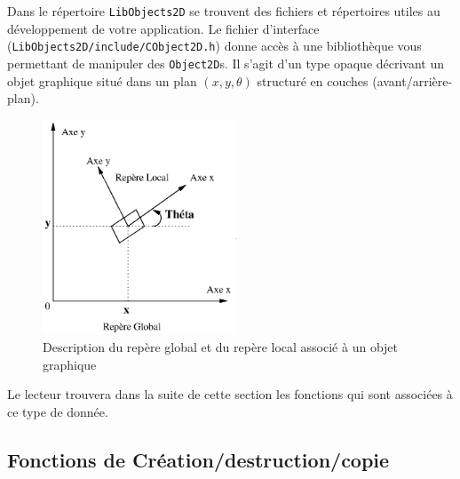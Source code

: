 \documentclass[12pt]{article}
\begin{document}
Dans le r\'epertoire \verb!LibObjects2D!
se trouvent des fichiers et r\'epertoires
utiles au d\'eveloppe\-ment de votre application.
Le fichier d'interface (\verb!LibObjects2D/include/CObject2D.h!)
donne acc\`es \`a une biblioth\`e\-que vous
permettant de manipuler des \verb!Object2D!s. Il s'agit d'un type
opaque d\'ecrivant un objet graphique situ\'e dans un plan $(x,y,\theta)$
structur\'e en couches (avant/arri\`ere-plan).

\begin{figure}[hbtp]
\begin{center}
\includegraphics[width=5.8cm]{fig/reperes}
\end{center}
\caption{Description du rep\`ere global et du rep\`ere local associ\'e
\`a un objet graphique} 
\end{figure}

\newpage
Le lecteur trouvera dans la suite de cette section les fonctions qui sont
associ\'ees \`a ce type de donn\'ee.

\subsection{Fonctions de Cr\'eation/destruction/copie}
\end{document}
